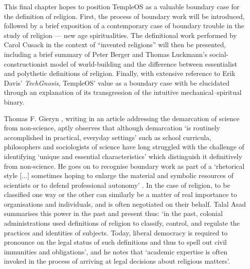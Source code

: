 



This final chapter hopes to position TempleOS as a
valuable boundary case for the definition of religion.
First, the process of boundary work will be introduced,
followed by a brief exposition of a contemporary case of boundary trouble
in the study of religion --- new age spiritualities.
The definitional work performed by Carol Cusack in the context of
``invented religions'' will then be presented, including a brief summary of
Peter Berger and Thomas Luckmann's social-constructionist model of
world-building and the difference between essentialist and polythetic
definitions of religion.
Finally, with extensive reference to Erik Davis' \textit{TechGnosis},
TempleOS' value as a boundary case with be elucidated through
an explanation of its transgression of the intuitive mechanical--spiritual
binary.

Thomas F. Gieryn \parencite*[781]{Gieryn83}, writing in an article
addressing the demarcation of science from non-science, aptly observes
that although demarcation `is routinely accomplished in practical,
everyday settings' such as school curricula,
philosophers and sociologists of science have long struggled
with the challenge of identifying `unique and essential characteristics'
which distinguish it definitively from non-science.
He goes on to recognise boundary work as part of a `rhetorical style [...]
sometimes hoping to enlarge the material and symbolic resources of scientists
or to defend professional autonomy' \parencite[782]{Gieryn83}.
In the case of religion, to be classified one way or the other can similarly
be a matter of real importance to organisations and individuals,
and is often negotiated on their behalf.
Talal Asad \parencite*[39]{Asad11} summarises this power
in the past and present thus:
`in the past, colonial  administrations  used definitions of religion
to classify, control, and regulate the practices and identities of subjects.
Today, liberal democracy  is required to pronounce on the legal status
of such definitions and thus to spell out civil immunities and obligations',
and he notes that `academic expertise is often invoked
in the process of arriving at legal decisions about religious matters'.

